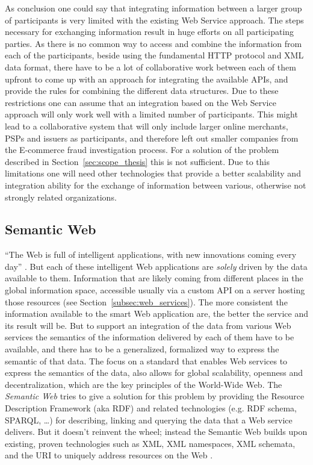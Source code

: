 As conclusion one could say that integrating information between a larger group of participants is very limited with the existing Web Service approach. The steps necessary for exchanging information result in huge efforts on all participating parties. As there is no common way to access and combine the information from each of the participants, beside using the fundamental \gls{HTTP} protocol and \gls{XML} data format, there have to be a lot of collaborative work between each of them upfront to come up with an approach for integrating the available \gls{API}s, and provide the rules for combining the different data structures. Due to these restrictions one can assume that an integration based on the Web Service approach will only work well with a limited number of participants. This might lead to a collaborative system that will only include larger online merchants, \gls{PSP}s and issuers as participants, and therefore left out smaller companies from the \gls{E-commerce} fraud investigation process. For a solution of the problem described in Section~\ref{sec:scope_thesis} this is not sufficient. Due to this limitations one will need other technologies that provide a better scalability and integration ability for the exchange of information between various, otherwise not strongly related organizations.


\subsection{Semantic Web}
\label{subsec:web_data}

``The Web is full of intelligent applications, with new innovations coming every day'' \citep{allemang2011semantic}. But each of these intelligent Web applications are \emph{solely} driven by the data available to them. Information that are likely coming from different places in the global information space, accessible usually via a custom \gls{API} on a server hosting those resources (see Section~\ref{subsec:web_services}). The more consistent the information available to the smart Web application are, the better the service and its result will be. But to support an integration of the data from various Web services the semantics of the information delivered by each of them have to be available, and there has to be a generalized, formalized way to express the semantic of that data. The focus on a standard that enables Web services to express the semantics of the data, also allows for global scalability, openness and decentralization, which are the key principles of the World-Wide Web. The \emph{Semantic Web} tries to give a solution for this problem by providing the Resource Description Framework (aka \gls{RDF}) and related technologies (e.g. RDF schema, \gls{SPARQL}, \ldots) for describing, linking and querying the data that a Web service delivers. But it doesn’t reinvent the wheel; instead the Semantic Web builds upon existing, proven technologies such as \gls{XML}, \gls{XML} namespaces, \gls{XML} schemata, and the \gls{URI} to uniquely address resources on the Web \citep{allemang2011semantic}. \\


